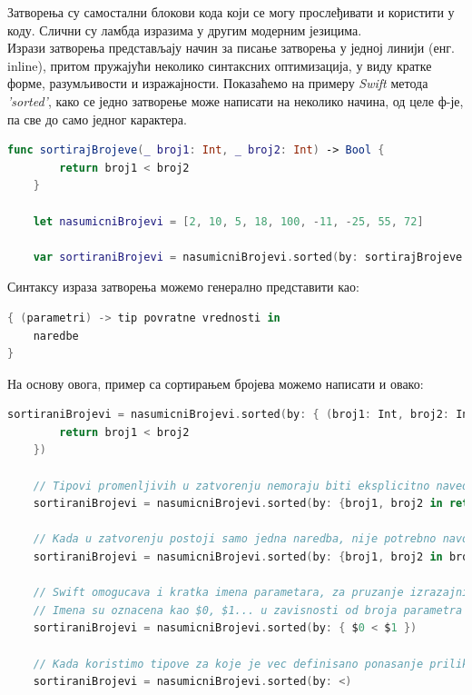 \documentclass[12pt,oneside]{memoir}
\begin{document}
\indent Затворења су самостални блокови кода који се могу прослеђивати и користити у коду. Слични су ламбда изразима у другим модерним језицима. \\
\indent Изрази затворења представљају начин за писање затворења у једној линији (енг. inline), притом пружајући неколико синтаксних оптимизација, у виду кратке форме, разумљивости и изражајности. 
Показаћемо на примеру \textit{Swift} метода \textit{'sorted'}, како се једно затворење може написати на неколико начина, од целе ф-је, па све до само једног карактера.

\begin{lstlisting}[caption=\textit{{Затворење кроз ф-ју}}, label={lst:Затворење кроз ф-ју}, language=Swift, frame=single]
    func sortirajBrojeve(_ broj1: Int, _ broj2: Int) -> Bool {
        return broj1 < broj2
    }
    
    let nasumicniBrojevi = [2, 10, 5, 18, 100, -11, -25, 55, 72]
    
    var sortiraniBrojevi = nasumicniBrojevi.sorted(by: sortirajBrojeve
\end{lstlisting}

\indent Синтаксу израза затворења можемо генерално представити као:
\begin{lstlisting}[language=Swift, frame=single]
{ (parametri) -> tip povratne vrednosti in
    naredbe
}
\end{lstlisting}

\indent На основу овога, пример са сортирањем бројева можемо написати и овако:
\begin{lstlisting}[caption=\textit{{Израз затворења за сортирање}}, label={lst:Израз затворења за сортирање}, language=Swift, frame=single]
    sortiraniBrojevi = nasumicniBrojevi.sorted(by: { (broj1: Int, broj2: Int) -> Bool in
        return broj1 < broj2
    })
    
    // Tipovi promenljivih u zatvorenju nemoraju biti eksplicitno navedeni, zato sto se odredjuju na osnovu tipa elemenata niza nad kojim se radi
    sortiraniBrojevi = nasumicniBrojevi.sorted(by: {broj1, broj2 in return broj1 <  broj2})
    
    // Kada u zatvorenju postoji samo jedna naredba, nije potrebno navodjenje kljucne reci 'return', povratna vrednost bice vrednost izvrsenja te naredbe
    sortiraniBrojevi = nasumicniBrojevi.sorted(by: {broj1, broj2 in broj1 < broj2})
    
    // Swift omogucava i kratka imena parametara, za pruzanje izrazajnije sintakse
    // Imena su oznacena kao $0, $1... u zavisnosti od broja parametra u f-ji
    sortiraniBrojevi = nasumicniBrojevi.sorted(by: { $0 < $1 })
    
    // Kada koristimo tipove za koje je vec definisano ponasanje prilikom poredjenja, mozemo proslediti samo kako zelimo da sortiramo clanove niza
    sortiraniBrojevi = nasumicniBrojevi.sorted(by: <)
\end{lstlisting}
\end{document}
